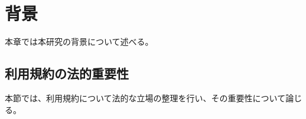 \chapter{背景}
\label{background}
本章では本研究の背景について述べる。

\section{利用規約の法的重要性}
本節では、利用規約について法的な立場の整理を行い、その重要性について論じる。


